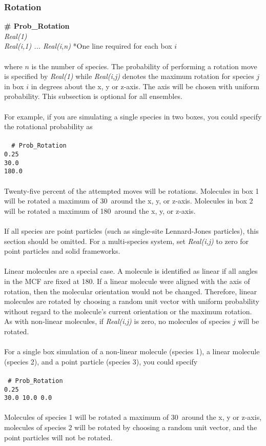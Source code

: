 \subsubsection{Rotation}
{\bf \# Prob\_Rotation}\\
{\it Real(1)} \\
{\it Real(i,1) ... Real(i,n)} *One line required for each box $i$ \\ \\
%
where $n$ is the number of species.
The probability of performing a rotation move is specified by 
{\it Real(1)} while {\it Real(i,j)} denotes the maximum rotation
for species $j$ in box $i$ in degrees about the x, y or z-axis.
The axis will be chosen with uniform probability.
This subsection is optional for all ensembles. \\ \\
%
For example, if you are simulating a single species in two boxes, 
you could specify the rotational probability as \\ \\
\texttt{
{ \# Prob\_Rotation} \\
 0.25 \\
30.0\\
180.0} \\ \\ 
%
Twenty-five percent of the attempted moves will be rotations.
Molecules in box 1 will be rotated a maximum of 30\degree\ around the x, y, or z-axis.
Molecules in box 2 will be rotated a maximum of 180\degree\ around the x, y, or z-axis. \\ \\
%
If all species are point particles (such as single-site Lennard-Jones particles), 
this section should be omitted.
For a multi-species system, 
set {\it Real(i,j)} to zero for point particles and solid frameworks. \\ \\
%
Linear molecules are a special case. 
A molecule is identified as linear if all angles in the MCF are fixed at 180\degree .
If a linear molecule were aligned with the axis of rotation, 
then the molecular orientation would not be changed.
Therefore, linear molecules are rotated by choosing a random unit vector with uniform probability 
without regard to the molecule's current orientation or the maximum rotation.
As with non-linear molecules, if {\it Real(i,j)} is zero, no molecules of species $j$ will be rotated. \\ \\
%
For a single box simulation of a non-linear molecule (species 1), a linear molecule (species 2), 
and a point particle (species 3), you could specify \\ \\
%
\texttt{
{\# Prob\_Rotation} \\
 0.25 \\
30.0 10.0 0.0} \\ \\
%
Molecules of species 1 will be rotated a maximum of 30\degree\ around the x, y or z-axis,
molecules of species 2 will be rotated by choosing a random unit vector, and
the point particles will not be rotated.
%
%
%
